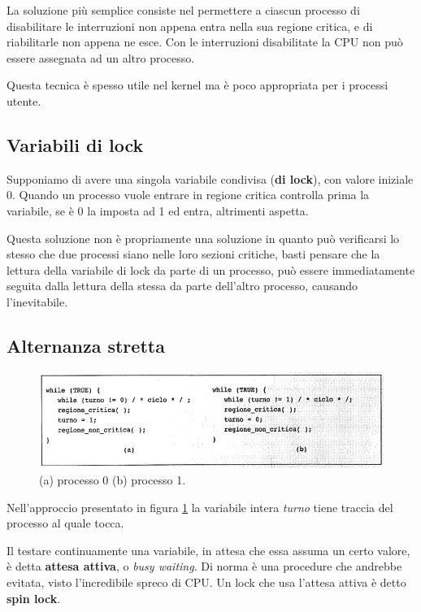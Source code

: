 La soluzione più semplice consiste nel permettere a ciascun processo di disabilitare le interruzioni non appena entra nella sua regione critica, e di riabilitarle non appena ne esce. Con le interruzioni disabilitate la CPU non può essere assegnata ad un altro processo.

Questa tecnica è spesso utile nel kernel ma è poco appropriata per i processi utente.


\subsection{Variabili di lock}
Supponiamo di avere una singola variabile condivisa (\textbf{di lock}), con valore iniziale 0. Quando un processo vuole entrare in regione critica controlla prima la variabile, se è 0 la imposta ad 1 ed entra, altrimenti aspetta.

Questa soluzione non è propriamente una soluzione in quanto può verificarsi lo stesso che due processi siano nelle loro sezioni critiche, basti pensare che la lettura della variabile di lock da parte di un processo, può essere immediatamente seguita dalla lettura della stessa da parte dell'altro processo, causando l'inevitabile.

\subsection{Alternanza stretta}

\begin{figure}[H]
    \centering
    \includegraphics[width=1\linewidth]{assets/alternanzastretta6.png}
    \caption{(a) processo 0 (b) processo 1.}
    \label{alternanzastretta}
\end{figure}

Nell'approccio presentato in figura \ref{alternanzastretta} la variabile intera \textit{turno} tiene traccia del processo al quale tocca. 

Il testare continuamente una variabile, in attesa che essa assuma un certo valore, è detta \textbf{attesa attiva}, o \textit{busy waiting}. Di norma è una procedure che andrebbe evitata, visto l'incredibile spreco di CPU.
Un lock che usa l'attesa attiva è detto \textbf{spin lock}.

